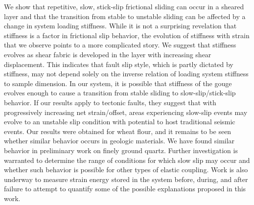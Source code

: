 We show that repetitive, slow, stick-slip frictional sliding can occur in a
sheared layer and that the transition from stable to unstable sliding can be
affected by a change in system loading stiffness.  While it is not a surprising
revelation that stiffness is a factor in frictional slip behavior, the evolution
of stiffness with strain that we observe points to a more complicated story. We
suggest that stiffness evolves as shear fabric is developed in the layer with
increasing shear displacement. This indicates that fault slip style, which is
partly dictated by stiffness, may not depend solely on the inverse relation of
loading system stiffness to sample dimension. In our system, it is possible that
stiffness of the gouge evolves enough to cause a transition from stable sliding
to slow-slip/stick-slip behavior. If our results apply to tectonic faults, they
suggest that with progressively increasing net strain/offset, areas experiencing
slow-slip events may evolve to an unstable slip condition with potential to host
traditional seismic events. Our results were obtained for wheat flour, and it
remains to be seen whether similar behavior occurs in geologic materials.  We
have found similar behavior in preliminary work on finely ground quartz. Further
investigation is warranted to determine the range of conditions for which slow
slip may occur and whether such behavior is possible for other types of elastic
coupling. Work is also underway to measure strain energy stored in the system
before, during, and after failure to attempt to quantify some of the possible
explanations proposed in this work.

